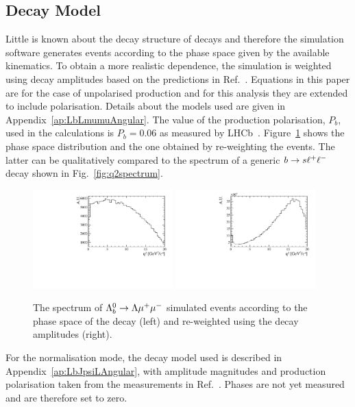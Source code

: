 \subsection{Decay Model}
\label{decaymodel}

Little is known about the decay structure of \Lb decays and therefore the simulation software generates events
according to the phase space given by the available kinematics. To obtain a more realistic \qsq dependence,
the simulation is weighted using decay amplitudes based on the predictions in Ref.~\cite{Gutsche:2013pp}.
Equations in this paper are for the case of unpolarised \Lb production and for this analysis they are extended to include polarisation.
Details about the models used are given in Appendix~\ref{ap:LbLmumuAngular}. The value of the \Lb production polarisation, $P_b$, 
used in the calculations is $P_b = 0.06$ as measured by LHCb~\cite{Aaij:2013oxa}. 
Figure~\ref{fig:decaymodeleffonq2} shows the phase space \qsq distribution and the one obtained by re-weighting the events.
The latter can be qualitatively compared to the \qsq spectrum of a generic ${b}\rightarrow{\ensuremath{s}}\ell^+ \ell^-$ decay
shown in Fig.~\ref{fig:q2spectrum}.
%
\begin{figure}
\centering
\includegraphics[width=0.48\textwidth]{Lmumu/figs/Q2_beforemodel.pdf}
\includegraphics[width=0.48\textwidth]{Lmumu/figs/Q2_aftermodel.pdf}
\caption{The \qsq spectrum of ${{\Lambda}^0_{b}}\rightarrow{\ensuremath{\Lambda}}{\ensuremath{\mu^+\mu^-}}$ simulated events according to the
phase space of the decay (left) and re-weighted using the decay amplitudes (right).}
\label{fig:decaymodeleffonq2}
\end{figure}
%
For the normalisation mode, the decay model used is described in Appendix~\ref{ap:LbJpsiLAngular},
with amplitude magnitudes and production polarisation taken from the measurements in
Ref.~\cite{Aaij:2013oxa}. Phases are not yet measured and are therefore set to zero.

